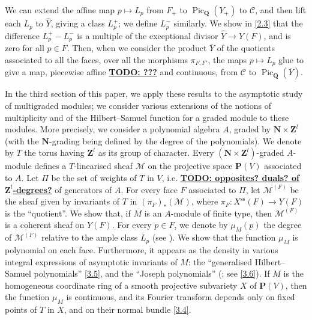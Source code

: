 \documentclass{article}
\theoremstyle{plain}
\theoremstyle{definition}
\newcommand{\sh}[1]{{\mathscr{#1}}}
\newcommand{\PP}{\mathbf{P}}
\newcommand{\QQ}{\mathbf{Q}}
\newcommand{\NN}{\mathbf{N}}
\newcommand{\ZZ}{\mathbf{Z}}
\renewcommand{\ss}{\mathrm{ss}}
\DeclareMathOperator{\Pic}{Pic}
\newcommand{\unsure}[1]{\underline{\textbf{TODO: #1}}}
\newcommand{\oldpage}[1]{\marginpar{\footnotesize$\Big\vert$ \textit{p.~#1}}}
\begin{document}
We can extend the affine map $p\mapsto L_p$ from $F_+$ to $\Pic_\QQ(Y_+)$ to $\mathcal{C}$, and then lift each $L_p$ to $\hat{Y}$, giving a class $L_p^+$;
we define $L_p^-$ similarly.
We show in \cref{2.3} that the difference $L_p^+ - L_p^-$ is a multiple of the exceptional divisor $\hat{Y}\to Y(F)$, and is zero for all $p\in F$.
Then, when we consider the product $\bar{Y}$ of the quotients associated to all the faces, over all the morphisms $\pi_{F,F'}$, the maps $p\mapsto L_p$ glue to give a map, piecewise affine \unsure{???} and continuous, from $\mathcal{C}$ to $\Pic_\QQ(\overline{Y})$.

In the third section of this paper, we apply these results to the asymptotic study of multigraded modules;
we consider various extensions of the notions of multiplicity and of the Hilbert--Samuel function for a graded module to these modules.
More precisely, we consider a polynomial algebra $A$, graded by $\NN\times\ZZ^l$ (with the $\NN$-grading being defined by the degree of the polynomials).
We denote by $T$ the torus having $\ZZ^l$ as its group of character.
Every $(\NN\times\ZZ^l)$-graded $A$-module defines
\oldpage{511}
a $T$-linearised sheaf $\sh{M}$ on the projective space $\PP(V)$ associated to $A$.
Let $\Pi$ be the set of weights of $T$ in $V$, i.e. \unsure{opposites? duals? of $\ZZ^l$-degrees?} of generators of $A$.
For every face $F$ associated to $\Pi$, let $\sh{M}^{(F)}$ be the sheaf given by invariants of $T$ in $(\pi_F)_*(\sh{M})$, where $\pi_F\colon X^\ss(F)\to Y(F)$ is the ``quotient''.
We show that, if $M$ is an $A$-module of finite type, then $\sh{M}^{(F)}$ is a coherent sheaf on $Y(F)$.
For every $p\in F$, we denote by $\mu_M(p)$ the degree of $\sh{M}^{(F)}$ relative to the ample class $L_p$ (see \cite[I.3]{Kle}).
We show that the function $\mu_M$ is polynomial on each face.
Furthermore, it appears as the density in various integral expressions of asymptotic invariants of $M$: the ``generalised Hilbert--Samuel polynomials'' \cref{3.5}, and the ``Joseph polynomials'' (\cite{Jos}; see \cref{3.6}).
If $M$ is the homogeneous coordinate ring of a smooth projective subvariety $X$ of $\PP(V)$, then the function $\mu_M$ is continuous, and its Fourier transform depends only on fixed points of $T$ in $X$, and on their normal bundle \cref{3.4}.
\end{document}

